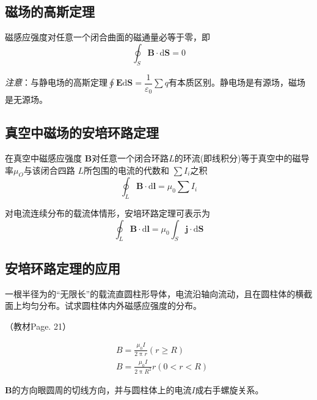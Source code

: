 \documentclass[12pt]{article}
\newcommand{\rmd}{\mathrm{d}}
\begin{document}
\subsection{磁场的高斯定理}

磁感应强度对任意一个闭合曲面的磁通量必等于零，即
\begin{equation}
    \oint_S \boldsymbol{B} \cdot \rmd \boldsymbol{S} = 0
\end{equation}

\emph{注意}：与静电场的高斯定理$\oint \boldsymbol{E} \rmd \boldsymbol{S} = \dfrac{1}{\varepsilon_0} \sum q$有本质区别。静电场是有源场，磁场是无源场。

\subsection{真空中磁场的安培环路定理}

在真空中磁感应强度 $\boldsymbol{B}$对任意一个闭合环路$L$的环流(即线积分)等于真空中的磁导率$\mu_ O $与该闭合四路 $L $所包围的电流的代数和 $\sum I_ i$之积
\begin{equation}
    \oint_L \boldsymbol{B} \cdot \rmd \boldsymbol{l} = \mu_0 \sum I_i
\end{equation}

对电流连续分布的载流体情形，安培环路定理可表示为
\begin{equation}
    \oint_L \boldsymbol{B} \cdot \rmd \boldsymbol{l} = \mu_0 \int_S \boldsymbol{j} \cdot \rmd \boldsymbol{S}
\end{equation}

\subsection{安培环路定理的应用}

一根半径为的“无限长”的载流直圆柱形导体，电流沿轴向流动，且在圆柱体的横截面上均匀分布。试求圆柱体内外磁感应强度的分布。

（教材Page. 21）

\begin{equation*}
    \begin{aligned}
        & B = \frac{\mu_0 I}{2 \uppi r} (r \geq R) \\
        & B = \frac{\mu_0 I}{2 \uppi R^2} r (0 < r < R)
    \end{aligned}
\end{equation*}

\(\boldsymbol{B}\)的方向眼圆周的切线方向，并与圆柱体上的电流\(I\)成右手螺旋关系。
\end{document}
